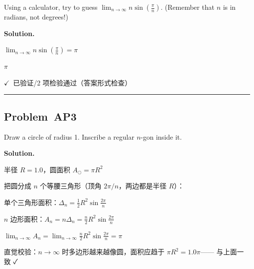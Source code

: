 \documentclass[12pt, a4paper]{article}
\newcommand{\problem}[1]{\subsection*{Problem~#1}}
\newcommand{\solution}{%
  \par\noindent
  {\color{solutiongreen}\bfseries Solution.}\par
}
\newcommand{\verifyok}{\textcolor{solutiongreen}{\ensuremath{\checkmark}\ 已验证}}
\begin{document}
\begin{stepbox}
Using a calculator, try to guess $\lim_{n \to \infty} n \sin(\frac{\pi}{n})$. (Remember that $n$ is in radians, not degrees!)
\end{stepbox}

\solution

\begin{stepbox}
$\lim_{n \to \infty} n \sin{\left(\frac{\pi}{n} \right)} = \pi$
\end{stepbox}

\begin{center}
$\boxed{\pi}$
\end{center}

\begin{verifybox}\small \verifyok{}/2 项检验通过（答案形式检查） \end{verifybox}

\vspace{0.8em}\hrule\vspace{0.8em}

\problem{AP3}

\begin{stepbox}
Draw a circle of radius 1. Inscribe a regular $n$-gon inside it.
\end{stepbox}

\solution

\begin{stepbox}
半径 $R = 1.0$，圆面积 $A_\bigcirc = \pi R^2$
\end{stepbox}

\begin{stepbox}
把圆分成 $n$ 个等腰三角形（顶角 $2\pi/n$，两边都是半径 $R$）：
\end{stepbox}

\begin{stepbox}
单个三角形面积：$\Delta_n = \frac{1}{2}R^2\sin\frac{2\pi}{n}$
\end{stepbox}

\begin{stepbox}
$n$ 边形面积：$A_n = n\Delta_n = \frac{n}{2}R^2\sin\frac{2\pi}{n}$
\end{stepbox}

\begin{stepbox}
$\lim_{n \to \infty} A_n = \lim_{n\to\infty} \frac{n}{2}R^2\sin\frac{2\pi}{n} = \pi$
\end{stepbox}

\begin{stepbox}
直觉校验：$n\to\infty$ 时多边形越来越像圆，面积应趋于 $\pi R^2 = 1.0 \pi$—— 与上面一致 ✓
\end{stepbox}
\end{document}
